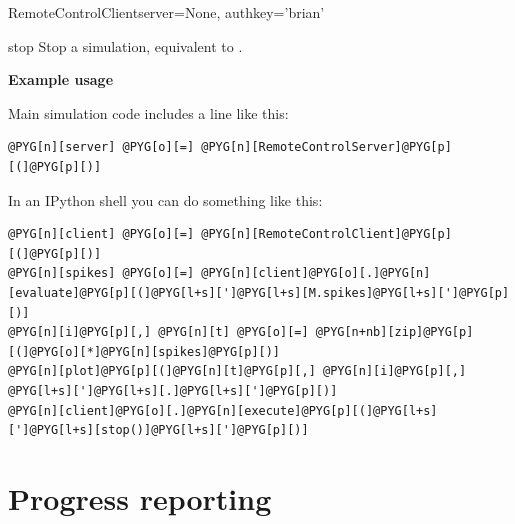 \documentclass[letterpaper,10pt,english]{manual}
\begin{document}
\begin{classdesc}{RemoteControlClient}{server=None, authkey='brian'}
\hypertarget{brian.RemoteControlClient.stop}{}\begin{methoddesc}{stop}{}
Stop a simulation, equivalent to .
\end{methoddesc}

\textbf{Example usage}

Main simulation code includes a line like this:

\begin{Verbatim}[commandchars=@\[\]]
@PYG[n][server] @PYG[o][=] @PYG[n][RemoteControlServer]@PYG[p][(]@PYG[p][)]
\end{Verbatim}

In an IPython shell you can do something like this:

\begin{Verbatim}[commandchars=@\[\]]
@PYG[n][client] @PYG[o][=] @PYG[n][RemoteControlClient]@PYG[p][(]@PYG[p][)]
@PYG[n][spikes] @PYG[o][=] @PYG[n][client]@PYG[o][.]@PYG[n][evaluate]@PYG[p][(]@PYG[l+s][']@PYG[l+s][M.spikes]@PYG[l+s][']@PYG[p][)]
@PYG[n][i]@PYG[p][,] @PYG[n][t] @PYG[o][=] @PYG[n+nb][zip]@PYG[p][(]@PYG[o][*]@PYG[n][spikes]@PYG[p][)]
@PYG[n][plot]@PYG[p][(]@PYG[n][t]@PYG[p][,] @PYG[n][i]@PYG[p][,] @PYG[l+s][']@PYG[l+s][.]@PYG[l+s][']@PYG[p][)]
@PYG[n][client]@PYG[o][.]@PYG[n][execute]@PYG[p][(]@PYG[l+s][']@PYG[l+s][stop()]@PYG[l+s][']@PYG[p][)]
\end{Verbatim}
\end{classdesc}

\resetcurrentobjects
\hypertarget{--doc-reference-progressreporting}{}

\hypertarget{index-107}{}\section{Progress reporting}
\end{document}
